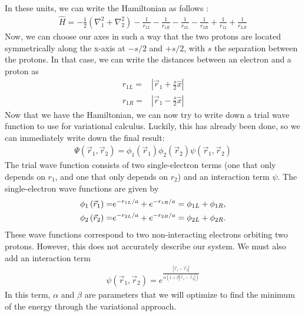 In these units, we can write the Hamiltonian as follows \cite{MSU_paper}:
\begin{align}
\hat H =  - \frac{1}{2}\left( {\nabla _1^2 + \nabla _2^2} \right) - \frac{1}{{{r_{1L}}}} - \frac{1}{{{r_{1R}}}} - \frac{1}{{{r_{2L}}}} - \frac{1}{{{r_{2R}}}} + \frac{1}{{{r_{12}}}} + \frac{1}{{{r_{LR}}}}
\end{align}
Now, we can choose our axes in such a way that the two protons are located symmetrically along the x-axis at $-s/2$ and $+s/2$, with $s$ the separation between the protons. In that case, we can write the distances between an electron and a proton as
\begin{align}
{r_{1L}} =& \left| {{{\vec r}_1} + \frac{s}{2}\hat x} \right|\\{r_{1R}} =& \left| {{{\vec r}_1} - \frac{s}{2}\hat x} \right|
\end{align}
Now that we have the Hamiltonian, we can now try to write down a trial wave function to use for variational calculus. Luckily, this has already been done, so we can immediately write down the final result\cite{MSU_paper}:
\begin{align}
\Psi \left( {{{\vec r}_1},{{\vec r}_2}} \right) = {\phi _1}\left( {{{\vec r}_1}} \right){\phi _2}\left( {{{\vec r}_2}} \right)\psi \left( {{{\vec r}_1},{{\vec r}_2}} \right)
\end{align}
The trial wave function consists of two single-electron terms (one that only depends on $r_1$, and one that only depends on $r_2$) and an interaction term $\psi$. The single-electron wave functions are given by
\begin{align}
{\phi _1}\left( {{{\vec r}_1}} \right) =& {e^{ - {{{r_{1L}}} \mathord{\left/
 {\vphantom {{{r_{1L}}} a}} \right.
 \kern-\nulldelimiterspace} a}}} + {e^{ - {{{r_{1R}}} \mathord{\left/
 {\vphantom {{{r_{1R}}} a}} \right.
 \kern-\nulldelimiterspace} a}}} = {\phi _{1L}} + {\phi _{1R}},\\
 {\phi _2}\left( {{{\vec r}_2}} \right) =& {e^{ - {{{r_{2L}}} \mathord{\left/
 {\vphantom {{{r_{2L}}} a}} \right.
 \kern-\nulldelimiterspace} a}}} + {e^{ - {{{r_{2R}}} \mathord{\left/
 {\vphantom {{{r_{2R}}} a}} \right.
 \kern-\nulldelimiterspace} a}}} = {\phi _{2L}} + {\phi _{2R}}.
\end{align}
These wave functions correspond to two non-interacting electrons orbiting two protons. However, this does not accurately describe our system. We must also add an interaction term
\begin{align}
\psi \left( {{{\vec r}_1},{{\vec r}_2}} \right) = {e^{\frac{{\left| {{{\vec r}_1} - {{\vec r}_2}} \right|}}{{\alpha \left( {1 + \beta \left| {{{\vec r}_1} - {{\vec r}_2}} \right|} \right)}}}}
\end{align}
In this term, $\alpha$ and $\beta$ are parameters that we will optimize to find the minimum of the energy through the variational approach.\\


